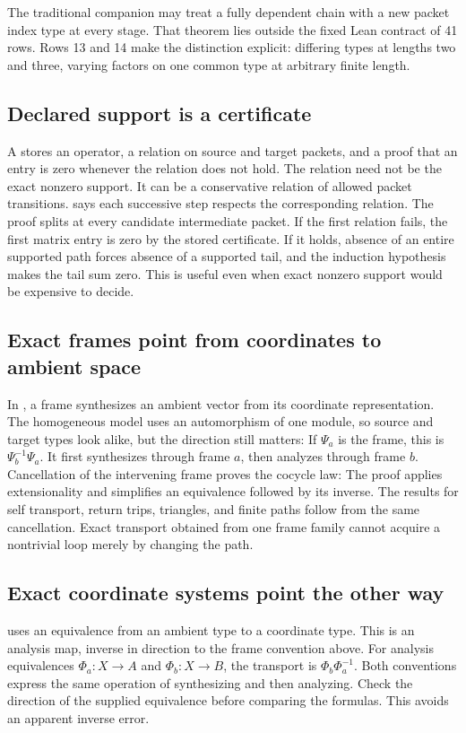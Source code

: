 The traditional companion may treat a fully dependent chain with a new packet index type at every stage. That theorem lies outside the fixed Lean contract of 41 rows. Rows 13 and 14 make the distinction explicit: differing types at lengths two and three, varying factors on one common type at arbitrary finite length.

\subsection{Declared support is a certificate}
A  stores an operator, a relation on source and target packets, and a proof that an entry is zero whenever the relation does not hold. The relation need not be the exact nonzero support. It can be a conservative relation of allowed packet transitions.  says each successive step respects the corresponding relation.
The proof splits at every candidate intermediate packet. If the first relation fails, the first matrix entry is zero by the stored certificate. If it holds, absence of an entire supported path forces absence of a supported tail, and the induction hypothesis makes the tail sum zero. This is useful even when exact nonzero support would be expensive to decide.

\subsection{Exact frames point from coordinates to ambient space}
In , a frame synthesizes an ambient vector from its coordinate representation. The homogeneous model uses an automorphism of one module, so source and target types look alike, but the direction still matters:
If $\Psi_a$ is the frame, this is $\Psi_b^{-1}\Psi_a$. It first synthesizes through frame $a$, then analyzes through frame $b$. Cancellation of the intervening frame proves the cocycle law:
The proof applies extensionality and simplifies an equivalence followed by its inverse. The results for self transport, return trips, triangles, and finite paths follow from the same cancellation. Exact transport obtained from one frame family cannot acquire a nontrivial loop merely by changing the path.

\subsection{Exact coordinate systems point the other way}
 uses an equivalence  from an ambient type to a coordinate type. This is an analysis map, inverse in direction to the frame convention above.
For analysis equivalences $\Phi_a:X\to A$ and $\Phi_b:X\to B$, the transport is $\Phi_b\Phi_a^{-1}$. Both conventions express the same operation of synthesizing and then analyzing. Check the direction of the supplied equivalence before comparing the formulas. This avoids an apparent inverse error.

